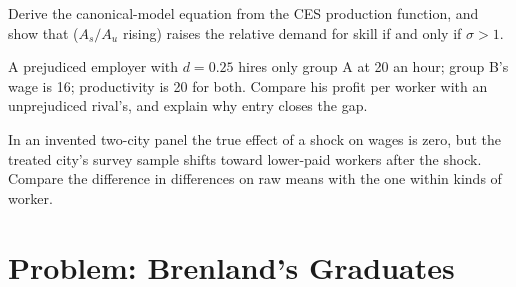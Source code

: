 \begin{exercise}[$\star\star\star$]\label{exo:b3:wage-structure:10}
Derive the canonical-model equation from the CES production function, and show that
 ($A_s/A_u$ rising) raises the relative demand for skill if and
only if $\sigma > 1$.
\end{exercise}

\begin{exercise}[$\star\star\star$]\label{exo:b3:wage-structure:11}
A prejudiced employer with $d = 0.25$ hires only group A at 20 an hour; group B's wage is 16;
productivity is 20 for both. Compare his profit per worker with an unprejudiced rival's,
and explain why entry closes the gap.
\end{exercise}

\begin{exercise}[$\star\star\star$]\label{exo:b3:wage-structure:12}
In an invented two-city panel the true effect of a shock on wages is zero, but the
treated city's survey sample shifts toward lower-paid workers after the shock.
Compare the difference in differences on raw means with the one within kinds of
worker.
\end{exercise}

\section{Problem: Brenland's Graduates}\label{sec:b3:wage-structure:problem}

